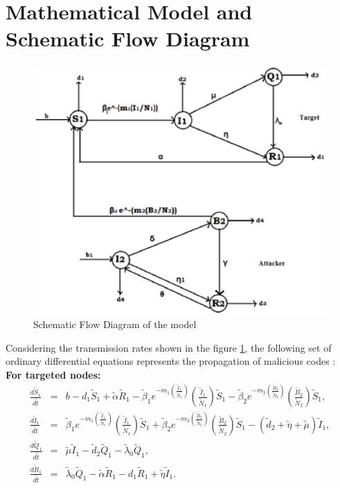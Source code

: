  \clearpage

\section{Mathematical Model and Schematic Flow Diagram}
\begin{figure}[h]
\includegraphics[width=5.7in]{13-DR1}

\caption{Schematic Flow Diagram of the model}
\label{13-DR1}
\end{figure}

Considering the transmission rates shown in the figure \ref{13-DR1}, the following set of ordinary differential equations represents the propagation of malicious codes :\\
{\bf For targeted nodes:}
\begin{eqnarray}
  \frac{d \tilde S_1}{d \tilde t}  &=&  b-d_1 \tilde S_1+ \tilde \alpha \tilde R_1 - \tilde \beta_1 e^{-m_1 \left(\frac{ \tilde I_1}{ \tilde N_1}\right)}\left(\frac{ \tilde I_1}{ \tilde N_1}\right) \tilde S_1- \tilde \beta_2 e^{-m_2 \left(\frac{ \tilde B_2}{ \tilde N_2}\right)} \left(\frac{ \tilde B_2}{ \tilde N_2}\right) \tilde S_1, \\
   \frac{d \tilde I_1}{d \tilde t} &=& \tilde \beta_1 e^{-m_1 \left(\frac{\tilde I_1}{\tilde N_1}\right)}\left(\frac{\tilde I_1}{\tilde N_1}\right) \tilde S_1+\tilde \beta_2 e^{-m_2 \left(\frac{\tilde B_2}{\tilde N_2}\right)} \left(\frac{\tilde B_2}{\tilde N_2}\right)\tilde S_1 - (\tilde d_2+ \tilde\eta +\tilde \mu)\tilde I_1, \\
  \frac{d \tilde Q_1}{d \tilde t} &=& \tilde \mu \tilde I_1 -\tilde d_2 \tilde Q_1 - \tilde \lambda_0 \tilde Q_1, \\
 \frac{d \tilde R_1}{d \tilde t} &=&  \tilde\lambda_0 \tilde Q_1-\tilde \alpha \tilde R_1-d_1 \tilde R_1+ \tilde\eta \tilde I_1 .
\end{eqnarray}

